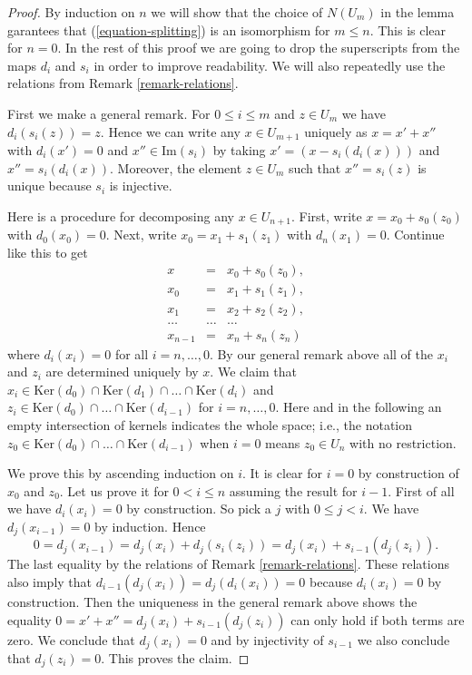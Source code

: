 \begin{proof}
By induction on $n$ we will show that the choice of $N(U_m)$
in the lemma garantees that (\ref{equation-splitting}) is
an isomorphism for $m \leq n$. This is clear for $n = 0$.
In the rest of this proof we are going to
drop the superscripts from the maps $d_i$ and $s_i$ in order
to improve readability. We will also repeatedly use the relations
from Remark \ref{remark-relations}.

\medskip\noindent
First we make a general remark.
For $0 \leq i \leq m$ and $z \in U_m$ we have
$d_i(s_i(z)) = z$. Hence we can write
any $x \in U_{m + 1}$ uniquely as
$x = x' + x''$ with $d_i(x') = 0$
and $x'' \in \text{Im}(s_i)$
by taking $x' = (x - s_i(d_i(x)))$ and
$x'' = s_i(d_i(x))$. Moreover, the element
$z \in U_m$ such that $x'' = s_i(z)$
is unique because $s_i$ is injective.

\medskip\noindent
Here is a procedure for decomposing
any $x \in U_{n + 1}$.
First, write $x = x_0 + s_0(z_0)$ with $d_0(x_0) = 0$.
Next, write $x_0 = x_1 + s_1(z_1)$ with
$d_n(x_1) = 0$. Continue like this to get
\begin{eqnarray*}
x & = & x_0 + s_0(z_0), \\
x_0 & = & x_1 + s_1(z_1), \\
x_1 & = & x_2 + s_2(z_2), \\
\ldots & \ldots & \ldots \\
x_{n - 1} & = & x_n + s_n(z_n)
\end{eqnarray*}
where $d_i(x_i) = 0$ for all $i = n, \ldots, 0$.
By our general remark above all of the $x_i$
and $z_i$ are determined uniquely by $x$.
We claim that
$x_i \in
\text{Ker}(d_0) \cap
\text{Ker}(d_1) \cap
\ldots \cap
\text{Ker}(d_i)$
and
$z_i \in
\text{Ker}(d_0) \cap
\ldots \cap
\text{Ker}(d_{i - 1})$
for $i = n, \ldots, 0$.
Here and in the following
an empty intersection of kernels indicates
the whole space; i.e.,
the notation
$z_0 \in \text{Ker}(d_0) \cap
\ldots \cap
\text{Ker}(d_{i - 1})$
when $i = 0$ means $z_0 \in U_n$ with no restriction.

\medskip\noindent
We prove this by ascending induction on $i$.
It is clear for $i = 0$ by construction of $x_0$ and $z_0$.
Let us prove it for $0 < i \leq n$ assuming the result for $i - 1$.
First of all we have $d_i(x_i) = 0$ by construction.
So pick a $j$ with $0 \leq j < i$. We have
$d_j(x_{i - 1}) = 0$ by induction. Hence
$$
0 = d_j(x_{i - 1})
= d_j(x_i) + d_j(s_i(z_i))
= d_j(x_i) + s_{i - 1}(d_j(z_i)).
$$
The last equality by the relations of Remark \ref{remark-relations}.
These relations also imply that
$d_{i - 1}(d_j(x_i)) = d_j(d_i(x_i)) = 0$
because $d_i(x_i)= 0$ by construction.
Then the uniqueness in the general remark above shows the equality
$0 = x' + x'' = d_j(x_i) + s_{i - 1}(d_j(z_i))$
can only hold if both terms are zero. We conclude that
$d_j(x_i) = 0$ and by injectivity of $s_{i - 1}$ we also
conclude that $d_j(z_i) = 0$. This proves the claim.


\end{proof}
